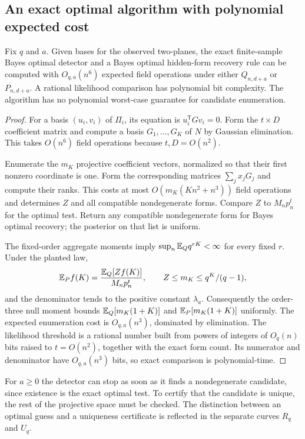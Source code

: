 \subsection{An exact optimal algorithm with polynomial expected cost}

\begin{proposition}
\label{prop:algorithm}
Fix $q$ and $a$. Given bases for the observed two-planes, the exact
finite-sample Bayes optimal detector and a Bayes optimal hidden-form
recovery rule can be computed with $O_{q,a}(n^6)$ expected field operations
under either $Q_{n,d+a}$ or $P_{n,d+a}$. A rational likelihood comparison
has polynomial bit complexity. The algorithm has no polynomial
worst-case guarantee for candidate enumeration.
\end{proposition}

\begin{proof}
For a basis $(u_i,v_i)$ of $\Pi_i$, its equation is
$u_i^{\mathsf T}Gv_i=0$. Form the $t\times D$ coefficient matrix and
compute a basis $G_1,\ldots,G_K$ of $N$ by Gaussian elimination. This
takes $O(n^6)$ field operations because $t,D=O(n^2)$.

Enumerate the $m_K$ projective coefficient vectors, normalized so that
their first nonzero coordinate is one. Form the corresponding matrices
$\sum_jx_jG_j$ and compute their ranks. This costs at most
$O(m_K(Kn^2+n^3))$ field operations and determines $Z$ and all compatible
nondegenerate forms. Compare $Z$ to $M_np_n^t$ for the optimal test.
Return any compatible nondegenerate form for Bayes optimal recovery;
the posterior on that list is uniform.

The fixed-order aggregate moments imply
$\sup_n\mathbb E_Q q^{rK}<\infty$ for every fixed $r$. Under the planted law,
\[
 \mathbb E_P f(K)=\frac{\mathbb E_Q[Zf(K)]}{M_np_n^t},\qquad
 Z\le m_K\le q^K/(q-1),
\]
and the denominator tends to the positive constant $\lambda_a$.
Consequently the order-three null moment bounds
$\mathbb E_Q[m_K(1+K)]$ and $\mathbb E_P[m_K(1+K)]$ uniformly. The expected
enumeration cost is $O_{q,a}(n^3)$, dominated by elimination.
The likelihood threshold is a rational number built from powers of
integers of $O_q(n)$ bits raised to $t=O(n^2)$, together with the exact
form count. Its numerator and denominator have $O_{q,a}(n^3)$ bits,
so exact comparison is polynomial-time.
\end{proof}

For $a\ge0$ the detector can stop as soon as it finds a nondegenerate
candidate, since existence is the exact optimal test. To certify that the
candidate is unique, the rest of the projective space must be checked.
The distinction between an optimal guess and a uniqueness certificate is
reflected in the separate curves $R_q$ and $U_q$.
